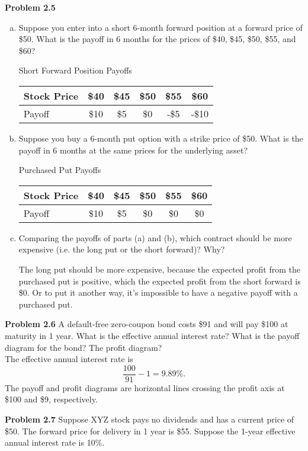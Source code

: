 \documentclass[12pt]{article}
\newcommand{\problem}[1]{\bigskip \noindent \textbf{Problem #1}}
\theoremstyle{plain}
\begin{document}
\problem{2.5}
\begin{enumerate}[(a)]
\item Suppose you enter into a short 6-month forward position at a forward price of \$50. What is the payoff in 6 months for the prices of \$40, \$45, \$50, \$55, and \$60?

\begin{center}
Short Forward Position Payoffs\\
\begin{tabular}{l||ccccc}
Stock Price & \$40 & \$45 & \$50 & \$55 & \$60 \\ \hline \hline
Payoff & \$10 & \$5 & \$0 & -\$5 & -\$10
\end{tabular}
\end{center}

\item Suppose you buy a 6-month put option with a strike price of \$50. What is the payoff in 6 months at the same prices for the underlying asset?

\begin{center}
Purchased Put Payoffs\\
\begin{tabular}{l||ccccc}
Stock Price & \$40 & \$45 & \$50 & \$55 & \$60 \\ \hline \hline
Payoff & \$10 & \$5 & \$0 & \$0 & \$0
\end{tabular}
\end{center}

\item Comparing the payoffs of parts (a) and (b), which contract should be more expensive (i.e. the long put or the short forward)? Why?

The long put should be more expensive, because the expected profit from the purchased put is positive, which the expected profit from the short forward is \$0. Or to put it another way, it's impossible to have a negative payoff with a purchased put.
\end{enumerate}

\problem{2.6} A default-free zero-coupon bond costs \$91 and will pay \$100 at maturity in 1 year. What is the effective annual interest rate? What is the payoff diagram for the bond? The profit diagram?\\

The effective annual interest rate is
\[
\frac{100}{91} - 1 = 9.89\%.
\]
The payoff and profit diagrams are horizontal lines crossing the profit axis at \$100 and \$9, respectively.

\problem{2.7} Suppose XYZ stock pays no dividends and has a current price of \$50. The forward price for delivery in 1 year is \$55. Suppose the 1-year effective annual interest rate is 10\%. 
\end{document}
